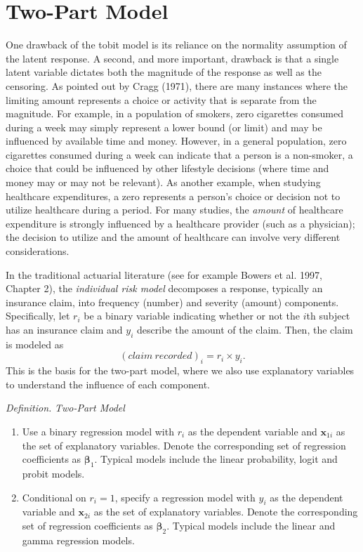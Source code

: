 \section{Two-Part Model}

One drawback of the tobit model is its reliance on the normality
assumption of the latent response. A second, and more important,
drawback is that a single latent variable dictates both the
magnitude of the response as well as the censoring. As pointed out
by Cragg (1971), there are many instances where the limiting amount
represents a choice or activity that is separate from the magnitude.
For example, in a population of smokers, zero cigarettes consumed
during a week may simply represent a lower bound (or limit) and may
be influenced by available time and money. However, in a general
population, zero cigarettes consumed during a week can indicate that
a person is a non-smoker, a choice that could be influenced by other
lifestyle decisions (where time and money may or may not be
relevant). As another example, when studying healthcare
expenditures, a zero represents a person's choice or decision not to
utilize healthcare during a period. For many studies, the
\emph{amount} of healthcare expenditure is strongly influenced by a
healthcare provider (such as a physician); the decision to utilize
and the amount of healthcare can involve very different
considerations.

In the traditional actuarial literature (see for example Bowers et
al. 1997, Chapter 2), the \emph{individual risk model} decomposes a
response, typically an insurance claim, into frequency (number) and
severity (amount) components. Specifically, let $r_i$ be a binary
variable indicating whether or not the $i$th subject has an
insurance claim and $y_i$ describe the amount of the claim. Then,
the
claim is modeled as%
\begin{equation*}
\left( claim~recorded\right)_i=r_i\times y_i.
\end{equation*}%
This is the basis for the two-part model, where we also use
explanatory variables to understand the influence of each component.

\bigskip

\boxedjed

\textit{Definition. }\emph{Two-Part Model}

\begin{enumerate}
\item Use a binary regression model with $r_i$ as the dependent variable
and $\mathbf{x}_{1i}$ as the set of explanatory variables. Denote
the corresponding set of regression coefficients as $\boldsymbol
\beta_{1}$. Typical models include the linear probability, logit and
probit models.

\item Conditional on $r_i=1$, specify a regression model with $y_i$ as
the dependent variable and $\mathbf{x}_{2i}$ as the set of
explanatory variables. Denote the corresponding set of regression
coefficients as $\boldsymbol \beta_{2}$. Typical models include the
linear and gamma regression models.
\end{enumerate}

